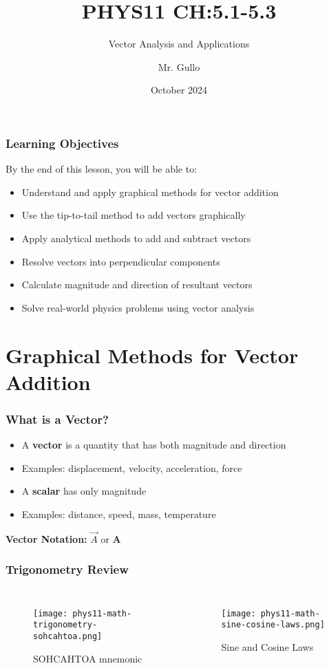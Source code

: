 \documentclass{beamer}
\title[ Vector Analysis]{PHYS11 CH:5.1-5.3}
\subtitle{Vector Analysis and Applications }
\author[Mr. Gullo]{Mr. Gullo}
\date[Oct 2024]{October 2024}
\begin{document}
\frame{\titlepage}

\begin{frame}
\frametitle{Learning Objectives}
By the end of this lesson, you will be able to:
\pause
\begin{itemize}
    \item Understand and apply graphical methods for vector addition \pause
    \item Use the tip-to-tail method to add vectors graphically \pause
    \item Apply analytical methods to add and subtract vectors \pause
    \item Resolve vectors into perpendicular components \pause
    \item Calculate magnitude and direction of resultant vectors \pause
    \item Solve real-world physics problems using vector analysis
\end{itemize}
\end{frame}

\section{Graphical Methods for Vector Addition}

\begin{frame}
\frametitle{What is a Vector?}
\begin{itemize}
    \item A \textbf{vector} is a quantity that has both magnitude and direction \pause
    \item Examples: displacement, velocity, acceleration, force \pause
    \item A \textbf{scalar} has only magnitude \pause
    \item Examples: distance, speed, mass, temperature \pause
\end{itemize}
\vspace{0.3cm}
\textbf{Vector Notation:} $\vec{A}$ or $\mathbf{A}$
\end{frame}

\begin{frame}
\frametitle{Trigonometry Review}
\begin{columns}[T] %
    \begin{figure}
        \centering
        \texttt{[image: phys11-math-trigonometry-sohcahtoa.png]}
        \caption{SOHCAHTOA mnemonic}
    \end{figure}

    \begin{figure}
        \centering
        \texttt{[image: phys11-math-sine-cosine-laws.png]}
        \caption{Sine and Cosine Laws}
    \end{figure}
\end{columns}
\end{frame}
\end{document}
